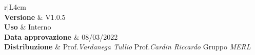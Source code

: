 \begin{center}
	\begin{tabular}{r|L{4cm}}
		 \\
		\hline
		\textbf{Versione}			& V1.0.5 \\
		\textbf{Uso}		& Interno \\
		\textbf{Data approvazione} 			& 08/03/2022 \\
		\textbf{Distribuzione} 	&	Prof.\textit{Vardanega Tullio} \newline Prof.\textit{Cardin Riccardo} \newline Gruppo \textit{MERL} \\
	\end{tabular}
\end{center}
